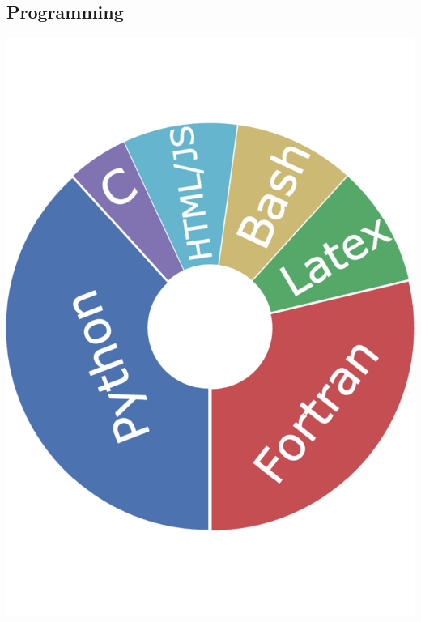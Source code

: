 \documentclass[]{friggeri-cv}
\begin{document}
\begin{aside}
  \section{Programming}
    \includegraphics[scale=0.15]{img/programming.pdf}
    ~
\end{aside}
\end{document}
